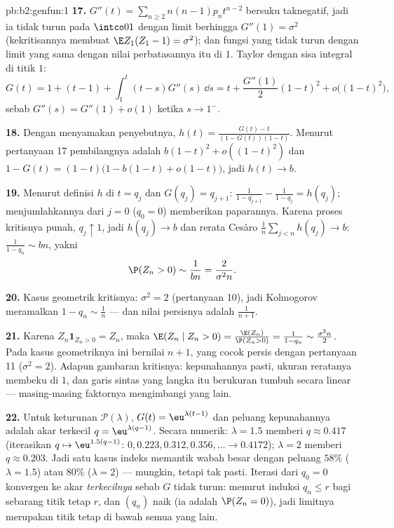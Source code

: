 \begin{solution}{pb:b2:genfun:1}
\textbf{17.} $G''(t) = \sum_{n\geq2}n(n-1)p_nt^{n-2}$ bersuku
taknegatif, jadi ia tidak turun pada $\intco01$ dengan
limit berhingga $G''(1) = \sigma^2$ (kekritisannya membuat
$\E Z_1(Z_1 - 1) = \sigma^2$); dan fungsi yang tidak turun dengan
limit yang sama dengan nilai perbatasannya itu  di $1$.
Taylor dengan sisa integral di titik $1$:
\[
G(t) = 1 + (t - 1) + \int_1^t(t - s)G''(s)\,\dd s
= t + \frac{G''(1)}2(1-t)^2 + o\bigl((1-t)^2\bigr),
\]
sebab $G''(s) = G''(1) + o(1)$ ketika $s \to 1^-$.

\textbf{18.} Dengan menyamakan penyebutnya, $h(t) =
\frac{G(t) - t}{(1 - G(t))(1 - t)}$. Menurut pertanyaan 17
pembilangnya adalah $b(1-t)^2 + o((1-t)^2)$ dan $1 - G(t) = (1 -
t)\bigl(1 - b(1-t) + o(1-t)\bigr)$, jadi $h(t) \to b$.

\textbf{19.} Menurut definisi $h$ di $t = q_j$ dan $G(q_j) =
q_{j+1}$: $\frac1{1 - q_{j+1}} - \frac1{1-q_j} = h(q_j)$;
menjumlahkannya dari $j = 0$ ($q_0 = 0$) memberikan paparannya. Karena
proses kritisnya punah, $q_j \uparrow 1$, jadi $h(q_j) \to
b$ dan rerata Cesàro $\frac1n\sum_{j<n}h(q_j) \to b$:
$\frac1{1-q_n} \sim bn$, yakni
\[
\P(Z_n > 0) \sim \frac1{bn} = \frac{2}{\sigma^2 n} .
\]

\textbf{20.} Kasus geometrik kritisnya: $\sigma^2 = 2$
(pertanyaan 10), jadi Kolmogorov meramalkan $1 - q_n \sim \frac1n$
--- dan nilai persisnya adalah $\frac1{n+1}$.

\textbf{21.} Karena $Z_n\mathbf 1_{Z_n > 0} = Z_n$, maka $\E(Z_n
\mid Z_n > 0) = \frac{\E(Z_n)}{\P(Z_n > 0)} = \frac1{1 -
q_n} \sim \frac{\sigma^2n}2$. Pada kasus geometriknya ini bernilai
$n + 1$, yang cocok persis dengan pertanyaan 11 ($\sigma^2 = 2$). Adapun
gambaran kritisnya: kepunahannya pasti, ukuran reratanya
membeku di $1$, dan garis sintas yang langka itu berukuran tumbuh
secara linear --- masing-masing faktornya mengimbangi yang lain.

\textbf{22.} Untuk keturunan $\mathcal P(\lambda)$, $G(t) =
\eu^{\lambda(t-1)}$ dan peluang kepunahannya adalah
akar terkecil $q = \eu^{\lambda(q-1)}$. Secara numerik:
$\lambda = 1.5$ memberi $q \approx 0.417$ (iterasikan $q \mapsto
\eu^{1.5(q-1)}$: $0, 0.223, 0.312, 0.356, \dots \to 0.4172$);
$\lambda = 2$ memberi $q \approx 0.203$. Jadi satu kasus indeks
memantik wabah besar dengan peluang $58\%$
($\lambda = 1.5$) atau $80\%$ ($\lambda = 2$) --- mungkin, tetapi tak
pasti. Iterasi dari $q_0 = 0$ konvergen ke
akar \emph{terkecilnya} sebab $G$ tidak turun: menurut
induksi $q_n \leq r$ bagi sebarang titik tetap $r$, dan $(q_n)$
naik (ia adalah $\P(Z_n = 0)$), jadi limitnya merupakan titik tetap
di bawah semua yang lain.


\end{solution}

